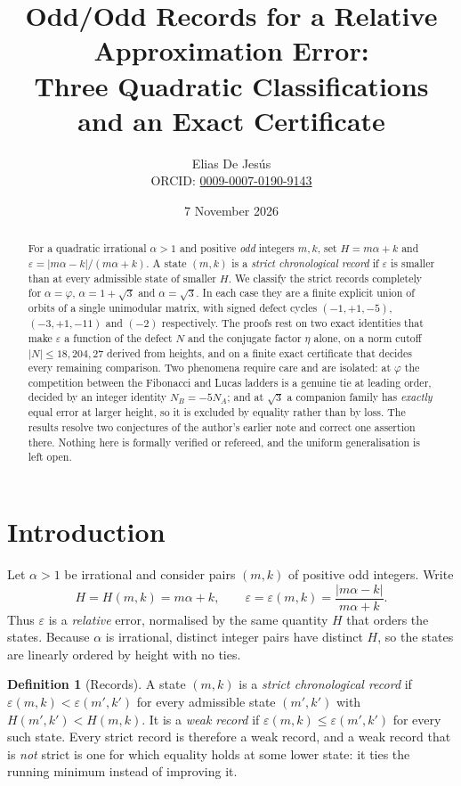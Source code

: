 \documentclass[11pt]{article}
\title{Odd/Odd Records for a Relative Approximation Error:\\
Three Quadratic Classifications and an Exact Certificate}
\author{Elias De Jes\'us\\
\small ORCID: \href{https://orcid.org/0009-0007-0190-9143}{0009-0007-0190-9143}}
\date{7 November 2026}
\theoremstyle{definition}
\newtheorem{definition}[theorem]{Definition}
\theoremstyle{remark}
\begin{document}
\maketitle

\begin{abstract}
For a quadratic irrational $\alpha>1$ and positive \emph{odd} integers $m,k$, set
$H=m\alpha+k$ and $\varepsilon=|m\alpha-k|/(m\alpha+k)$. A state $(m,k)$ is a
\emph{strict chronological record} if $\varepsilon$ is smaller than at every admissible state
of smaller $H$. We classify the strict records completely for $\alpha=\varphi$,
$\alpha=1+\sqrt3$ and $\alpha=\sqrt3$. In each case they are a finite explicit union of
orbits of a single unimodular matrix, with signed defect cycles $(-1,+1,-5)$, $(-3,+1,-11)$
and $(-2)$ respectively. The proofs rest on two exact identities that make $\varepsilon$ a
function of the defect $N$ and the conjugate factor $\eta$ alone, on a norm cutoff
$|N|\le 18,204,27$ derived from heights, and on a finite exact certificate that decides every
remaining comparison. Two phenomena require care and are isolated: at $\varphi$ the
competition between the Fibonacci and Lucas ladders is a genuine tie at leading order, decided
by an integer identity $N_B=-5N_A$; and at $\sqrt3$ a companion family has \emph{exactly}
equal error at larger height, so it is excluded by equality rather than by loss. The results
resolve two conjectures of the author's earlier note and correct one assertion there. Nothing
here is formally verified or refereed, and the uniform generalisation is left open.
\end{abstract}

\section{Introduction}\label{sec:intro}

Let $\alpha>1$ be irrational and consider pairs $(m,k)$ of positive odd integers. Write
\begin{equation}\label{eq:Heps}
H=H(m,k)=m\alpha+k,\qquad
\varepsilon=\varepsilon(m,k)=\frac{|m\alpha-k|}{m\alpha+k}.
\end{equation}
Thus $\varepsilon$ is a \emph{relative} error, normalised by the same quantity $H$ that orders
the states. Because $\alpha$ is irrational, distinct integer pairs have distinct $H$, so the
states are linearly ordered by height with no ties.

\begin{definition}[Records]\label{def:records}
A state $(m,k)$ is a \emph{strict chronological record} if
$\varepsilon(m,k)<\varepsilon(m',k')$ for every admissible state $(m',k')$ with $H(m',k')<H(m,k)$.
It is a \emph{weak record} if $\varepsilon(m,k)\le\varepsilon(m',k')$ for every such state.
Every strict record is therefore a weak record, and a weak record that is \emph{not} strict
is one for which equality holds at some lower state: it ties the running minimum instead of
improving it.
\end{definition}
\end{document}
